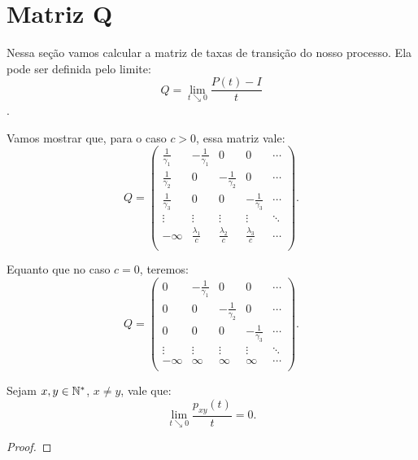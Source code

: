 
\section{Matriz Q}
\label{sec:matrizq}

Nessa seção vamos calcular a matriz de taxas de transição do nosso
processo. Ela pode ser definida pelo limite:
\begin{displaymath}
  Q = \lim_{t \searrow 0} \frac{P(t) - I}{t} 
\end{displaymath}.

Vamos mostrar que, para o caso $c > 0$, essa matriz vale:
\begin{displaymath}
  Q = \left(
    \begin{array}{ccccc}
      \frac{1}{\gamma_1} & -\frac{1}{\gamma_1} & 0 & 0 & \cdots \\
      \frac{1}{\gamma_2} & 0 & -\frac{1}{\gamma_2} & 0 & \cdots \\
      \frac{1}{\gamma_3} & 0 & 0 & -\frac{1}{\gamma_3} & \cdots \\
      \vdots & \vdots & \vdots & \vdots & \ddots \\
      -\infty & \frac{\lambda_1}{c} & \frac{\lambda_2}{c} &
      \frac{\lambda_3}{c} & \cdots \\
    \end{array}
  \right).
\end{displaymath}

Equanto que no caso $c=0$, teremos:
\begin{displaymath}
  Q = \left(
    \begin{array}{ccccc}
      0 & -\frac{1}{\gamma_1} & 0 & 0 & \cdots \\
      0 & 0 & -\frac{1}{\gamma_2} & 0 & \cdots \\
      0 & 0 & 0 & -\frac{1}{\gamma_3} & \cdots \\
      \vdots & \vdots & \vdots & \vdots & \ddots \\
      -\infty & \infty & \infty & \infty & \cdots \\
    \end{array}
  \right).
\end{displaymath}

\begin{proposicao}
  Sejam $x, y \in {\mathbb{N^*}}$, $x \neq y$, vale que:
  \begin{displaymath}
    \lim_{t \searrow 0} \frac{p_{xy}(t)}{t} = 0.
  \end{displaymath}
\end{proposicao}
\begin{proof}
  
\end{proof}

